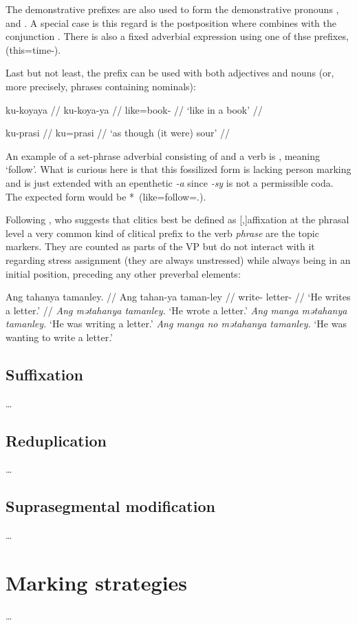 The demonstrative prefixes are also used to form the demonstrative 
pronouns , 
 and . A special case is 
this regard is the postposition  
where  combines with the conjunction . There is also a fixed adverbial expression using one of 
thse prefixes,  
(this=time-\Dat{}).

Last but not least, the prefix  can be used 
with both adjectives and nouns (or, more precisely, phrases containing 
nominals):

\pex
\a\begingl
	\gla ku-koyaya //
	\glb ku-koya-ya //
	\glc like=book-\Loc{} //
	\glft `like in a book' //
\endgl

\a\begingl
	\gla ku-prasi //
	\glb ku=prasi //
	\glft `as though (it were) sour' //
\endgl
\xe

An example of a set-phrase adverbial consisting of  and a verb 
is ,  meaning `follow'. 
What is curious here is that this fossilized form is lacking person marking 
and is just extended with an epenthetic \textit{-a} since \textit{-sy} is not 
a permissible coda. The expected form would be 
*\, (like=follow=\TsgI{}.\Aarg{}).

Following \citet{klavans1985}, who suggests that clitics best be defined as 
[,]{affixation at the phrasal level} a very common 
kind of clitical prefix to the verb \emph{phrase} are the topic markers. They 
are counted as parts of the VP but do not interact with it regarding stress 
assignment (they are always unstressed) while always being in an initial 
position, preceding any other preverbal elements:

\pex
	\a\begingl
		\gla Ang tahanya tamanley. //
		\glb Ang tahan-ya taman-ley //
		\glc \AgtT{} write-\TsgM{} letter-\PargI{} //
		\glft `He writes a letter.' //
	\endgl
	\a \textit{Ang mətahanya tamanley.} `He wrote a letter.'
	\a \textit{Ang manga mətahanya tamanley.} `He was writing a letter.'
	\a \textit{Ang manga no mətahanya tamanley.} `He was wanting to write a 
		letter.'
\xe

\subsection{Suffixation}

…

\subsection{Reduplication}

…

\subsection{Suprasegmental modification}

…

\section{Marking strategies}

…

